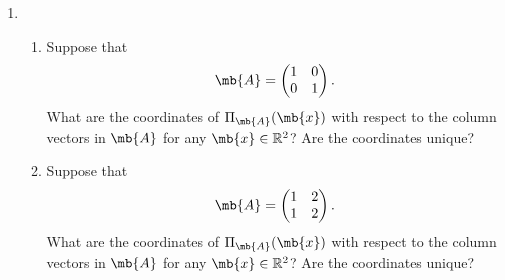 \begin{exercise}[Projection ]
\begin{enumerate}
        \item
            \begin{enumerate}
                \item Suppose that
                    \begin{align*}
                        \mb{A} = 
                        \begin{pmatrix}
                            1 & 0  \\
                            0 & 1
                        \end{pmatrix}
                        .
                    \end{align*}
                    What are the coordinates of $\Pi_{\mb{A}}(\mb{x})$ with respect to the column vectors in $\mb{A}$ for any $\mb{x} \in \mathbb{R}^2$? Are the coordinates unique?
                \item Suppose that
                    \begin{align*}
                        \mb{A} = 
                        \begin{pmatrix}
                            1 & 2  \\
                            1 & 2
                        \end{pmatrix}
                        .
                    \end{align*}
                    What are the coordinates of $\Pi_{\mb{A}}(\mb{x})$ with respect to the column vectors in $\mb{A}$ for any $\mb{x} \in \mathbb{R}^2$? Are the coordinates unique?
            \end{enumerate}
            

\end{enumerate}
\end{exercise}
